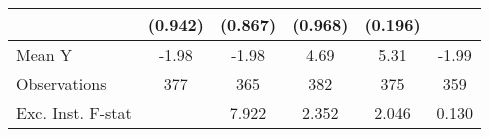 {\begin{tabular}{l*{5}{c}}
            &     (0.942)         &     (0.867)         &     (0.968)         &     (0.196)         &                     \\
\midrule
Mean Y      &       -1.98         &       -1.98         &        4.69         &        5.31         &       -1.99         \\
Observations&         377         &         365         &         382         &         375         &         359         \\
Exc. Inst. F-stat&                     &       7.922         &       2.352         &       2.046         &       0.130         \\
\bottomrule
\end{tabular}
}
